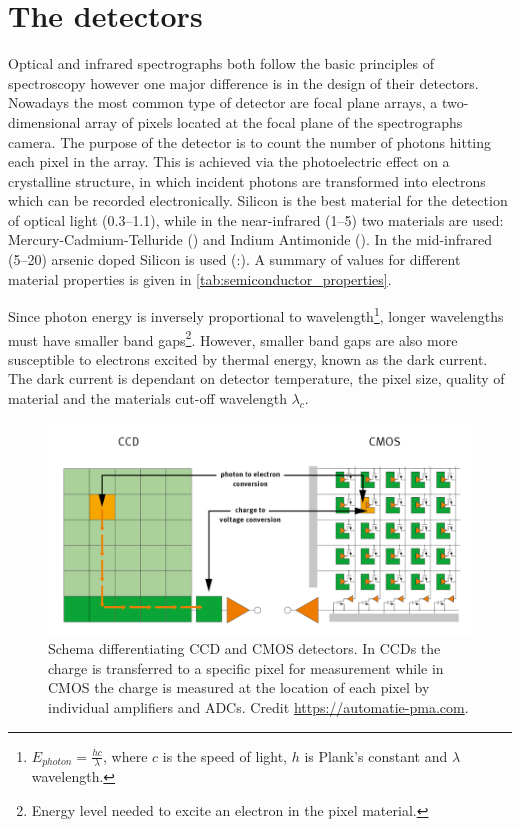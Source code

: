 \section{The detectors}
\label{subsec:nir_detectors}
Optical and infrared spectrographs both follow the basic principles of spectroscopy however one major difference is in the design of their detectors.
Nowadays the most common type of detector are focal plane arrays, a two-dimensional array of pixels located at the focal plane of the spectrographs camera.
The purpose of the detector is to count the number of photons hitting each pixel in the array.
This is achieved via the photoelectric effect on a crystalline structure, in which incident photons are transformed into electrons which can be recorded electronically.
Silicon is the best material for the detection of optical light (0.3--1.1\um), while in the near-infrared (1--5\um) two materials are used: {Mercury-Cadmium-Telluride} () and {Indium Antimonide} ().
In the mid-infrared (5--20\um) arsenic doped Silicon is used (:).
A summary of values for different material properties is given in \cref{tab:semiconductor_properties}.

Since photon energy is inversely proportional to wavelength\footnote{\(E_{photon} = \frac{h c}{\lambda}\), where \(c\) is the speed of light, \(h\) is Plank's constant and \(\lambda\) wavelength.}, longer wavelengths must have smaller band gaps\footnote{Energy  level needed to excite an electron in the pixel material.}.
However, smaller band gaps are also more susceptible to electrons excited by thermal energy, known as the dark current.
The dark current is dependant on detector temperature, the pixel size, quality of material and the materials cut-off wavelength \(\lambda_{c}\).




\begin{figure}
    \centering
    \includegraphics[width=0.8\linewidth]{figures/spectroscopy/CMOS-vs-CCD-schema}
    \caption[Schema differentiating {CCD} and {CMOS} detectors.]{Schema differentiating {CCD} and {CMOS} detectors.
    In {CCDs} the charge is transferred to a specific pixel for measurement while in {CMOS} the charge is measured at the location of each pixel by individual amplifiers and {ADCs}.
    Credit \href{https://automatie-pma.com/pma/innovatie-en-technologie-pma/cmos-vervangt-steeds-meer-hoogwaardige-ccd-toepassingen/}{https://automatie-pma.com}.}
    \label{fig:cmos-vs-ccd-schema}
\end{figure}

